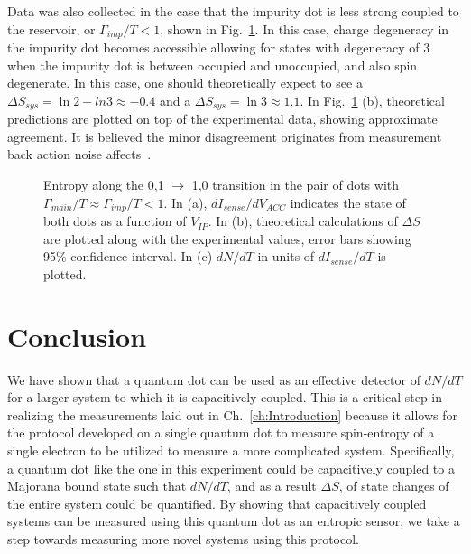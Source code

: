 Data was also collected in the case that the impurity dot is less strong coupled to the reservoir, or $\Gamma_{imp}/T < 1$, shown in Fig.~\ref{fig:smallg}. In this case, charge degeneracy in the impurity dot becomes accessible allowing for states with degeneracy of 3 when the impurity dot is between occupied and unoccupied, and also spin degenerate. In this case, one should theoretically expect to see a $\Delta S_{sys} = \ln 2 - ln 3 \approx -0.4$ and a $\Delta S_{sys} = \ln3 \approx 1.1$. In Fig.~\ref{fig:smallg} (b), theoretical predictions are plotted on top of the experimental data, showing approximate agreement. It is believed the minor disagreement originates from measurement back action noise affects~\cite{backactionensslin}.

\begin{figure}[h]
\centering
{}
\caption{Entropy along the 0,1 $\to$ 1,0 transition in the pair of dots with $\Gamma_{main}/T \approx \Gamma_{imp}/T < 1$. In (a), $dI_{sense}/dV_{ACC}$ indicates the state of both dots as a function of $V_{IP}$. In (b), theoretical calculations of $\Delta S$ are plotted along with the experimental values, error bars showing 95\% confidence interval. In (c) $dN/dT$ in units of $dI_{sense}/dT$ is plotted.}
\label{fig:smallg}      
\end{figure}


\section{Conclusion}
\label{sec:conclusion}

We have shown that a quantum dot can be used as an effective detector of $dN/dT$ for a larger system to which it is capacitively coupled. This is a critical step in realizing the measurements laid out in Ch.~\ref{ch:Introduction} because it allows for the protocol developed on a single quantum dot to measure spin-entropy of a single electron to be utilized to measure a more complicated system. Specifically, a quantum dot like the one in this experiment could be capacitively coupled to a Majorana bound state such that $dN/dT$, and as a result $\Delta S$, of state changes of the entire system could be quantified. By showing that capacitively coupled systems can be measured using this quantum dot as an entropic sensor, we take a step towards measuring more novel systems using this protocol.

\endinput

Any text after an \endinput is ignored.
You could put scraps here or things in progress.
